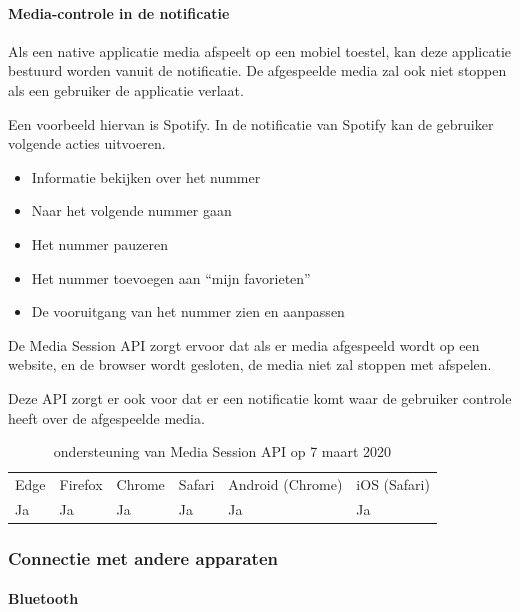 	
	\paragraph{Media-controle in de notificatie }
	
	
	Als een native applicatie media afspeelt op een mobiel toestel, kan deze applicatie bestuurd worden vanuit de notificatie. De afgespeelde media zal ook niet stoppen als een gebruiker de applicatie verlaat.
	
	Een voorbeeld hiervan is Spotify. In de notificatie van Spotify kan de gebruiker volgende acties uitvoeren.
	 \begin{itemize}
	   \item	Informatie bekijken over het nummer
	   \item	Naar het volgende nummer gaan
	   \item	Het nummer pauzeren
	   \item	Het nummer toevoegen aan “mijn favorieten”
	   \item	De vooruitgang van het nummer zien en aanpassen
	\end{itemize}
	De Media Session API \autocite{Beaufort2019} zorgt ervoor dat als er media afgespeeld wordt op een website, en de browser wordt gesloten, de media niet zal stoppen met afspelen.
	
	Deze API zorgt er ook voor dat er een notificatie komt waar de gebruiker controle heeft over de afgespeelde media. 
	
	
	\begin{table}[H]
		\centering
		\begin{tabular}{llllll}
			Edge & Firefox & Chrome & Safari & Android (Chrome) & iOS (Safari) \\
			Ja   & Ja      & Ja     & Ja     & Ja               & Ja          
		\end{tabular}	
		\caption{ondersteuning van Media Session API op 7 maart 2020}
	\end{table}
	
	
	
	\subsubsection{Connectie met andere apparaten}
	
	
	
	\paragraph{Bluetooth }
	
